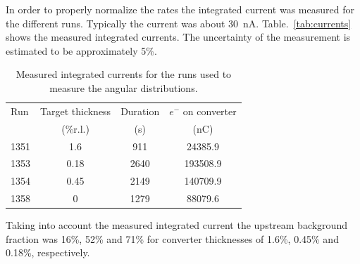In order to properly normalize the rates the integrated current was measured for the different 
runs. Typically the current was about 30~nA. Table.~\ref{tab:currents} shows the measured integrated currents.  The uncertainty of the measurement is estimated to be approximately 5\%. 
\begin{table}
\centering
\begin{tabular}{l|c|c|c}
Run & Target thickness & Duration &  $e^-$ on converter \\
 &  (\%r.l.) & (s) & (nC)    \\   
\hline\hline
1351 & 1.6   & 911 &     24385.9     \\
\hline
1353 & 0.18   & 2640 &    193508.9  \\
\hline
1354 & 0.45  & 2149 &       140709.9  \\
\hline
1358 & 0    & 1279  &   88079.6  \\
\hline
\end{tabular}
\caption{{\small Measured integrated currents for the runs used to measure the angular distributions.}}
\end{table}
Taking into account the measured integrated current 
the upstream background fraction was 16\%, 52\% and 71\% 
for converter thicknesses of 1.6\%, 0.45\% and 0.18\%, respectively. 

